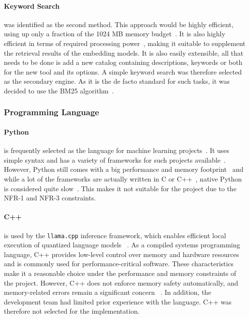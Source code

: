 \paragraph{Keyword Search} was identified as the second method. This approach would be highly efficient, using up only a fraction of the 1024 MB memory budget~\cite{li2026context}. It is also highly efficient in terms of required processing power~\cite{santhanam2023moving}, making it suitable to supplement the retrieval results of the embedding models. It is also easily extensible, all that needs to be done is add a new catalog containing descriptions, keywords or both for the new tool and its options. A simple keyword search was therefore selected as the secondary engine. As it is the de facto standard for such tasks, it was decided to use the BM25 algorithm~\cite{jeong2026bayesian}.

\subsubsection{Programming Language}

\paragraph{Python} is frequently selected as the language for machine learning projects~\cite{raschka2020machine}. It uses simple syntax and has a variety of frameworks for such projects available~\cite{raschka2020machine}. However, Python still comes with a big performance and memory footprint~\cite{berger2023triangulating} and while a lot of the frameworks are actually written in C or C++~\cite{raschka2020machine}, native Python is considered quite slow~\cite{berger2023triangulating}. This makes it not suitable for the project due to the NFR-1 and NFR-3 constraints.

\paragraph{C++} is used by the \texttt{llama.cpp} inference framework, which enables
efficient local execution of quantized language models ~\cite{malakhov2025llamacpp}. As a compiled systems programming language, C++ provides low-level control over memory and hardware resources and is commonly used for performance-critical software. These characteristics make it a reasonable choice under the performance and memory constraints of the project. However, C++ does not enforce memory safety automatically, and memory-related errors remain a significant concern ~\cite{santoso2023rust}. In addition, the development team had limited prior experience with the language. C++ was therefore not selected for the implementation.

